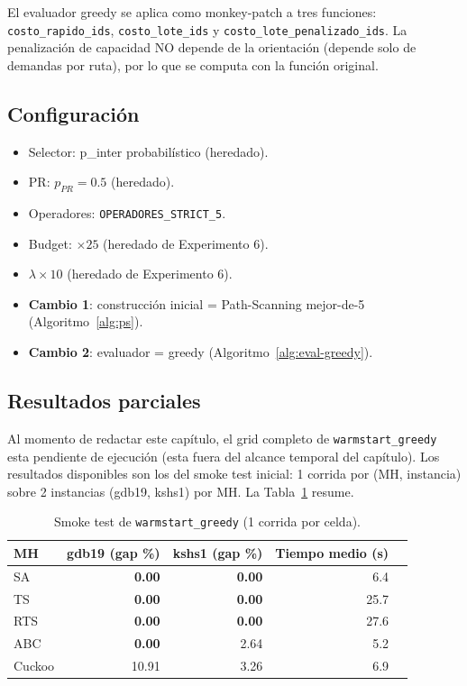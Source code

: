 El evaluador greedy se aplica como monkey-patch a tres funciones:
\texttt{costo\_rapido\_ids}, \texttt{costo\_lote\_ids} y
\texttt{costo\_lote\_penalizado\_ids}. La penalización de capacidad NO
depende de la orientación (depende solo de demandas por ruta), por lo
que se computa con la función original.

\subsection{Configuración}

\begin{itemize}
\item Selector: p\_inter probabilístico (heredado).
\item PR: $p_{PR} = 0.5$ (heredado).
\item Operadores: \texttt{OPERADORES\_STRICT\_5}.
\item Budget: $\times 25$ (heredado de Experimento 6).
\item $\lambda \times 10$ (heredado de Experimento 6).
\item \textbf{Cambio 1}: construcción inicial = Path-Scanning
  mejor-de-5 (Algoritmo~\ref{alg:ps}).
\item \textbf{Cambio 2}: evaluador = greedy
  (Algoritmo~\ref{alg:eval-greedy}).
\end{itemize}

\subsection{Resultados parciales}

Al momento de redactar este capítulo, el grid completo de
\texttt{warmstart\_greedy} esta pendiente de ejecución (esta fuera del
alcance temporal del capítulo). Los resultados disponibles son los del
smoke test inicial: 1 corrida por (MH, instancia) sobre 2 instancias
(gdb19, kshs1) por MH. La Tabla~\ref{tab:wsgreedy-smoke} resume.

\begin{table}[h]
\centering
\caption{Smoke test de \texttt{warmstart\_greedy} (1 corrida por celda).}
\label{tab:wsgreedy-smoke}
\small
\begin{tabular}{lrrrr}
\toprule
MH & gdb19 (gap \%) & kshs1 (gap \%) & Tiempo medio (s) \\
\midrule
SA      & \textbf{0.00} & \textbf{0.00} &  6.4 \\
TS      & \textbf{0.00} & \textbf{0.00} & 25.7 \\
RTS     & \textbf{0.00} & \textbf{0.00} & 27.6 \\
ABC     & \textbf{0.00} & 2.64 &  5.2 \\
Cuckoo  & 10.91 & 3.26 &  6.9 \\
\bottomrule
\end{tabular}
\end{table}


